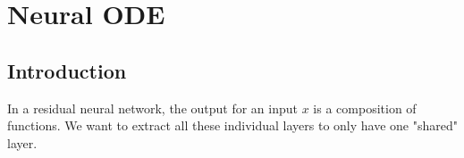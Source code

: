 \documentclass[10pt,a4paper]{article}
\theoremstyle{definition}
\theoremstyle{definition}
\newtheorem{theorem}{Theorem}
\theoremstyle{definition}
\begin{document}
%
%
%
%
%

\section{Neural ODE} \label{neuralode}

\subsection{Introduction}

In a residual neural network, the output for an input $x$ is a composition of functions. We want to extract all these individual layers to only have one "shared" layer.
\end{document}

